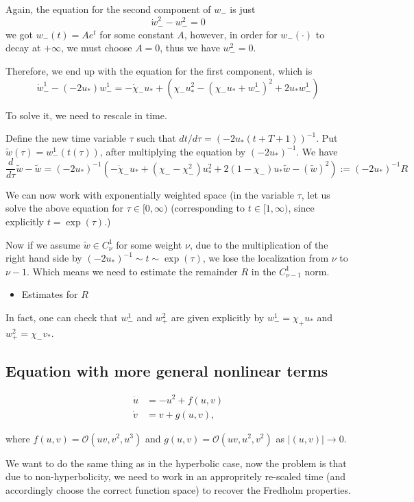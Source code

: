 \documentclass[letterpaper,11pt]{article}
\newcommand{\rmO}{\mathcal{O}}
\numberwithin{equation}{section}
\theoremstyle{plain}
\begin{document}
Again, the equation for the second component of $w_-$ is just
\[
\dot{w}_-^2 - w_-^2 = 0 
\]
we got $w_-(t) = A e^t$ for some constant $A$, however, in order for $w_-(\cdot)$ to decay at $+\infty$, we must choose $A=0$, thus we have $w_-^2 = 0$.

Therefore, we end up with the equation for the first component, which is
\[
\dot{w}_-^1 - (-2u_*)w_-^1 = -\dot{\chi}_- u_* + (\chi_-u_*^2 - (\chi_-u_*+w_-^1)^2 + 2u_*w_-^1)
\]

To solve it, we need to rescale in time.

Define the new time variable $\tau$ such that $dt/d\tau = (-2u_*(t+T+1))^{-1}$. Put $\tilde{w}(\tau) = w_-^1(t(\tau))$, after multiplying the equation by $(-2u_*)^{-1}$. We have
\[
\frac{d}{d\tau} \tilde{w} - \tilde{w} = (-2u_*)^{-1}\left( -\dot{\chi}_-u_* + (\chi_--\chi_-^2)u_*^2 +2(1-\chi_-)u_* \tilde{w} -(\tilde{w})^2 \right) := (-2u_*)^{-1} R
\] 

We can now work with exponentially weighted space (in the variable $\tau$, let us solve the above equation for $ \tau \in [0,\infty)$ (corresponding to $t \in [1,\infty)$, since explicitly $t = \exp(\tau)$.)

Now if we assume $\tilde{w} \in C^1_\nu$ for some weight $\nu$, due to the multiplication of the right hand side by $(-2u_*)^{-1} \sim t \sim \exp(\tau)$, we lose the localization from $\nu$ to $\nu-1$. Which means we need to estimate the remainder $R$ in the $C_{\nu-1}^1$ norm.

\begin{itemize}
\item Estimates for $R$
\end{itemize}

In fact, one can check that $w_-^1$ and $w_+^2$ are given explicitly by $w_-^1 = \chi_+ u_*$ and $w_+^2 = \chi_- v_*$.

\pagebreak

\subsection{Equation with more general nonlinear terms}
\begin{align}
\dot{u} &= -u^2+f(u,v) \label{Nhyp}\\
\dot{v} &= v +g(u,v) \label{Nhyp2}, 
\end{align}

where $f(u,v)=\rmO(uv,v^2,u^3)$ and $g(u,v) = \rmO(uv,u^2,v^2)$ as $|(u,v)| \to 0$.

We want to do the same thing as in the hyperbolic case, now the problem is that due to non-hyperbolicity, we need to work in an appropritely re-scaled time (and accordingly choose the correct function space) to recover the Fredholm properties.
\end{document}
